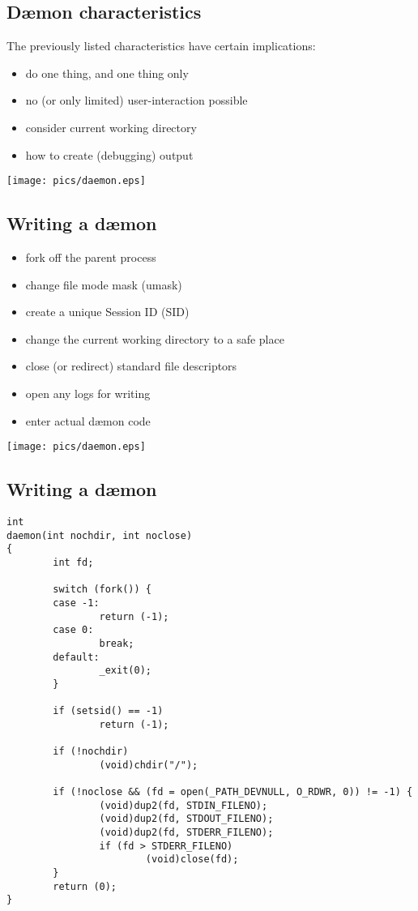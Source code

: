 \documentclass[xga]{xdvislides}
\begin{document}
\subsection{D\ae mon characteristics}
The previously listed characteristics have certain implications:
\\

\begin{itemize}
	\item do one thing, and one thing only
	\item no (or only limited) user-interaction possible
	\item consider current working directory
	\item how to create (debugging) output
\end{itemize}

\vfill
\hfill\texttt{[image: pics/daemon.eps]} \\

\subsection{Writing a d\ae mon}
\begin{itemize}
	\item fork off the parent process
	\item change file mode mask (umask)
	\item create a unique Session ID (SID)
	\item change the current working directory to a safe place
	\item close (or redirect) standard file descriptors
	\item open any logs for writing
	\item enter actual d\ae mon code
\end{itemize}

\vfill
\hfill\texttt{[image: pics/daemon.eps]} \\

\subsection{Writing a d\ae mon}
\small
\begin{verbatim}
int
daemon(int nochdir, int noclose)
{
        int fd;

        switch (fork()) {
        case -1:
                return (-1);
        case 0:
                break;
        default:
                _exit(0);
        }

        if (setsid() == -1)
                return (-1);

        if (!nochdir)
                (void)chdir("/");

        if (!noclose && (fd = open(_PATH_DEVNULL, O_RDWR, 0)) != -1) {
                (void)dup2(fd, STDIN_FILENO);
                (void)dup2(fd, STDOUT_FILENO);
                (void)dup2(fd, STDERR_FILENO);
                if (fd > STDERR_FILENO)
                        (void)close(fd);
        }
        return (0);
}
\end{verbatim}
\Normalsize
\end{document}
